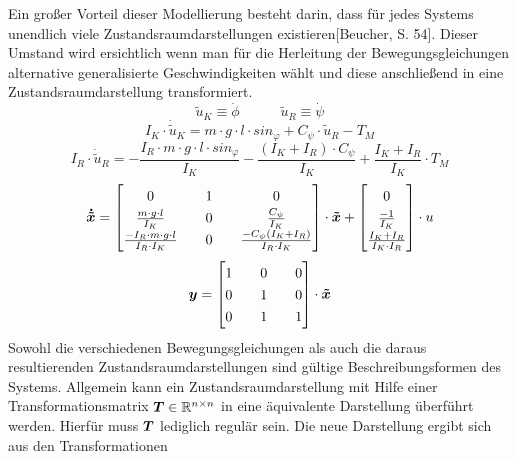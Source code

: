 Ein großer Vorteil dieser Modellierung besteht darin, dass für jedes Systems unendlich viele Zustandsraumdarstellungen existieren[Beucher, S. 54]. Dieser Umstand wird ersichtlich wenn man für die Herleitung der Bewegungsgleichungen alternative generalisierte Geschwindigkeiten wählt und diese anschließend in eine Zustandsraumdarstellung transformiert.
\begin{equation}
\tilde{u}_K \equiv \dot{\phi} \hspace{35pt} \tilde{u}_R \equiv \dot{\psi}
\end{equation}
\begin{equation}
I_K\cdot \dot{\tilde{u}}_K = m\cdot g \cdot l \cdot sin_{\varphi} + C_{\psi}\cdot \tilde{u}_R - T_M
\end{equation}
\begin{equation}
I_R\cdot \dot{\tilde{u}}_R = -\frac{I_R\cdot m\cdot g\cdot l\cdot sin_{\varphi}}{I_K} - \frac{(I_K + I_R)\cdot C_{\psi}}{I_K} + \frac{I_K + I_R}{I_K}\cdot T_M
\end{equation}
\begin{equation}
\renewcommand*{\arraystretch}{1.3}
\bs{\dot{\tilde{x}}} = \begin{bmatrix}
0 && 1 && 0 
\\
\frac{m\cdot g\cdot l}{I_K} && 0 && \frac{C_{\psi}}{I_K}
\\
\frac{-I_R\cdot m\cdot g\cdot l}{I_R\cdot I_K} && 0 && \frac{-C_{\psi}(I_K+I_R)}{I_R\cdot I_K} 
\end{bmatrix}\cdot \bs{\tilde{x}}
+
\begin{bmatrix}
0 \\ \frac{-1}{I_K} \\ \frac{I_K+I_R}{I_K\cdot I_R}
\end{bmatrix} \cdot u
\end{equation}
\begin{equation}
\bs{y} = \begin{bmatrix}
1 && 0 && 0 \\
0 && 1 && 0 \\
0 && 1 && 1 \\
\end{bmatrix} \cdot \bs{\tilde{x}}
\end{equation}
Sowohl die verschiedenen Bewegungsgleichungen als auch die daraus resultierenden Zustandsraumdarstellungen sind gültige Beschreibungsformen des Systems. Allgemein kann ein Zustandsraumdarstellung mit Hilfe einer Transformationsmatrix $\boldsymbol{T} \in \mathbb{R}^{n\times n}$ in eine äquivalente Darstellung überführt werden. Hierfür muss $\boldsymbol{T}$ lediglich regulär sein. Die neue Darstellung ergibt sich aus den Transformationen

